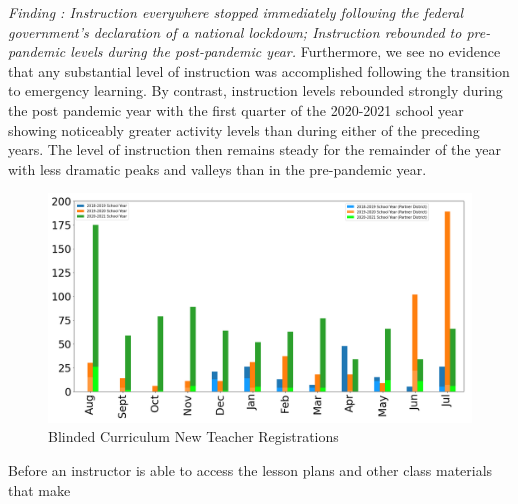 \documentclass[sigconf,manuscript,review,anonymous]{acmart} %
\def\ts{TIPP\&SEE}
\newcommand{\Scratchencore}[0]{Blinded Curriculum}
\begin{document}
\textit{Finding : Instruction everywhere stopped immediately following the federal government’s declaration of a national lockdown; Instruction rebounded to pre-pandemic levels during the post-pandemic year.}
Furthermore, we see no evidence that any substantial level of instruction was accomplished
following the transition to emergency learning. By contrast, instruction levels rebounded
strongly during the post pandemic year with the first quarter of the 2020-2021 
school year showing noticeably greater activity levels than during either of the preceding 
years. The level of instruction then remains steady for the remainder of the year with less dramatic 
peaks and valleys than in the pre-pandemic year.
\begin{figure}
     \centering
     \includegraphics[width=\textwidth]{images/graphs/AllTeacherRegistrations.png}
     \caption{\Scratchencore{} New Teacher Registrations}
     \label{fig:teacher_registrations}
    
\end{figure}
Before an instructor is able to access the lesson plans and other class materials that make
\end{document}
